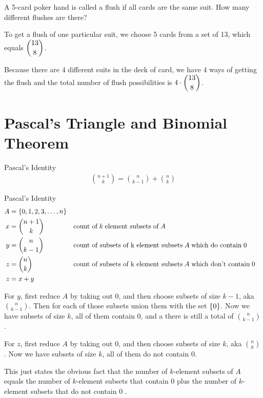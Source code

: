 \documentclass[openany, 12pt]{book}
\begin{document}
\begin{exercise}{}{}
	A 5-card poker hand is called a flush if all cards are the same suit. How
	many different flushes are there?
	\begin{alist}
		\item To get a flush of one particular suit, we choose 5 cards from a set of 13,
		which equals $\dbinom{13}{8}$.
		\item Because there are 4 different suits in the deck of card, we have 4 ways of
		getting the flush and the total number of flush possibilities is $4 \cdot
			\dbinom{13}{8}$.
	\end{alist}
\end{exercise}

\section{Pascal's Triangle and Binomial Theorem}

\begin{definition}{Pascal's Identity}{}
	\begin{align*}
		\binom{n+1}{k}=\binom{n}{k-1}+\binom{n}{k}
	\end{align*}
\end{definition}

\begin{intuition}{Pascal's Identity}{}
	\begin{align*}
		A & =\{0,1,2,3, \ldots, n\}                                                                                     \\
		x & =\binom{n+1}{k}           &  & \text{count of}\;k\;\text{element subsets of}\;A                               \\
		y & =\binom{n}{k-1}           &  & \text{count of subsets of k element subsets}\;A\;\text{which do contain}\;0    \\
		z & =\binom{n}{k}             &  & \text{count of subsets of k element subsets}\;A\;\text{which don't contain}\;0 \\
		z & =x + y
	\end{align*}

	\begin{alist}
		\item For $y$, first reduce $A$ by taking out $0$, and then choose
		subsets of size $k-1$, aka $\binom{n}{k-1}$.  Then for each of those
		subsets union them with the set $\{0\}$. Now we have subsets of size $k$, all of
		them contain 0, and a there is still a total of $\binom{n}{k-1}$.
		\item For $z$, first reduce $A$ by taking out $0$, and then choose
		subsets of size $k$, aka $\binom{n}{k}$.  Now we have subsets of size $k$, all of
		them do not contain 0.
		\item This just states the obvious fact that the number of $k$-element
		subsets of $A$ equals the number of $k$-element subsets that contain
		0 plus the number of $k$-element subsets that do not contain 0 .
	\end{alist}
\end{intuition}
\end{document}

